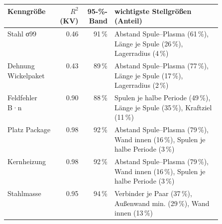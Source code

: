\begin{tabular}{@{}lrrp{0.5\linewidth}@{}}\toprule
Kenngröße & $R^2$ (KV) & 95-\%-Band & wichtigste Stellgrößen (Anteil) \\\midrule
Stahl σ99 & \num{0.46} & \num{91}\,\% & Abstand Spule–Plasma (\num{61}\,\%), Länge je Spule (\num{26}\,\%), Lagerradius (\num{4}\,\%) \\
Dehnung Wickelpaket & \num{0.43} & \num{89}\,\% & Abstand Spule–Plasma (\num{77}\,\%), Länge je Spule (\num{17}\,\%), Lagerradius (\num{2}\,\%) \\
Feldfehler B·n & \num{0.90} & \num{88}\,\% & Spulen je halbe Periode (\num{49}\,\%), Länge je Spule (\num{35}\,\%), Kraftziel (\num{11}\,\%) \\
Platz Package & \num{0.98} & \num{92}\,\% & Abstand Spule–Plasma (\num{79}\,\%), Wand innen (\num{16}\,\%), Spulen je halbe Periode (\num{3}\,\%) \\
Kernheizung & \num{0.98} & \num{92}\,\% & Abstand Spule–Plasma (\num{79}\,\%), Wand innen (\num{16}\,\%), Spulen je halbe Periode (\num{3}\,\%) \\
Stahlmasse & \num{0.95} & \num{94}\,\% & Verbinder je Paar (\num{37}\,\%), Außenwand min. (\num{29}\,\%), Wand innen (\num{13}\,\%) \\
\bottomrule\end{tabular}
